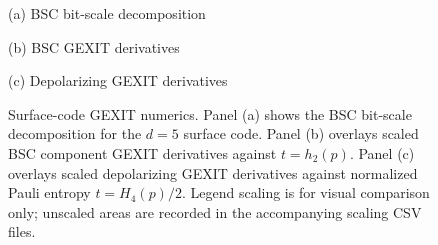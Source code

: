 \begin{figure}[t]
\centering
\begin{minipage}[t]{0.315\textwidth}
\centering

{\footnotesize (a) BSC bit-scale decomposition}
\end{minipage}\hfill
\begin{minipage}[t]{0.315\textwidth}
\centering

{\footnotesize (b) BSC GEXIT derivatives}
\end{minipage}\hfill
\begin{minipage}[t]{0.315\textwidth}
\centering

{\footnotesize (c) Depolarizing GEXIT derivatives}
\end{minipage}
\caption{Surface-code GEXIT numerics.  Panel (a) shows the BSC bit-scale
decomposition for the $d=5$ surface code.  Panel (b) overlays scaled BSC
component GEXIT derivatives against $t=h_2(p)$.  Panel (c) overlays scaled
depolarizing GEXIT derivatives against normalized Pauli entropy
$t=H_4(p)/2$.  Legend scaling is for visual comparison only; unscaled areas
are recorded in the accompanying scaling CSV files.}
\label{fig:surface-gexit-numerics}
\end{figure}
